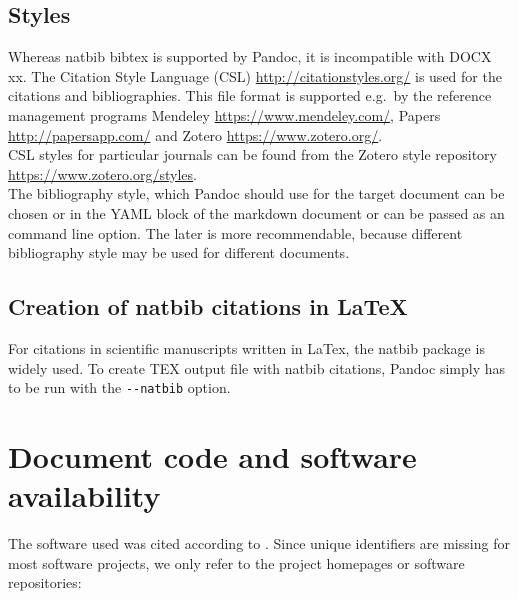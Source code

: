 \documentclass[10pt,fleq]{wlpeerj}
\begin{document}
\subsection{Styles}\label{styles}

Whereas
natbib
bibtex is
supported
by Pandoc,
it is
incompatible
with DOCX
xx. The
Citation
Style
Language
(CSL)
\url{http://citationstyles.org/}
is used
for the
citations
and
bibliographies.
This file
format is
supported
e.g.~by
the
reference
management
programs
Mendeley
\url{https://www.mendeley.com/},
Papers
\url{http://papersapp.com/}
and Zotero
\url{https://www.zotero.org/}.\\
CSL styles
for
particular
journals
can be
found from
the Zotero
style
repository
\url{https://www.zotero.org/styles}.\\
The
bibliography
style,
which
Pandoc
should use
for the
target
document
can be
chosen or
in the
YAML block
of the
markdown
document
or can be
passed as
an command
line
option.
The later
is more
recommendable,
because
different
bibliography
style may
be used
for
different
documents.

\subsection{Creation
of natbib
citations
in
LaTeX}\label{creation-of-natbib-citations-in-latex}

For
citations
in
scientific
manuscripts
written in
LaTex, the
natbib
package is
widely
used. To
create TEX
output
file with
natbib
citations,
Pandoc
simply has
to be run
with the
\texttt{-\/-natbib}
option.

\section{Document
code and
software
availability}\label{document-code-and-software-availability}

The
software
used was
cited
according
to
\citep[p23]{smith_software_2016, winkler_esiprot:_2010}.
Since
unique
identifiers
are
missing
for most
software
projects,
we only
refer to
the
project
homepages
or
software
repositories:
\end{document}
